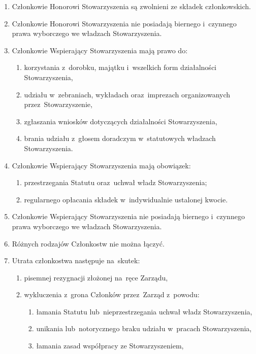 \documentclass{article}
\begin{document}
\begin{enumerate}
\begin{enumerate}
      \end{enumerate}
    \item Członkowie Honorowi Stowarzyszenia są zwolnieni ze składek członkowskich.
    \item Członkowie Honorowi Stowarzyszenia nie posiadają biernego i~czynnego prawa wyborczego we władzach Stowarzyszenia.
    \item[13a.] Członkowie Wspierający Stowarzyszenia mają prawo do:
      \begin{enumerate}[label=13a.\arabic*.]
        \item korzystania z~dorobku, majątku i~wszelkich form działalności Stowarzyszenia,
        \item udziału w~zebraniach, wykładach oraz~imprezach organizowanych przez~Stowarzyszenie,
        \item zgłaszania wniosków dotyczących działalności Stowarzyszenia,
        \item brania udziału z~głosem doradczym w~statutowych władzach Stowarzyszenia.
      \end{enumerate}
    \item[13b.] Członkowie Wspierający Stowarzyszenia mają obowiązek:
      \begin{enumerate}[label=13b.\arabic*.]
        \item przestrzegania Statutu oraz~uchwał władz Stowarzyszenia;
        \item regularnego opłacania składek w~indywidualnie ustalonej kwocie.
      \end{enumerate}
    \item[13c.] Członkowie Wspierający Stowarzyszenia nie posiadają biernego i~czynnego prawa wyborczego we władzach Stowarzyszenia.
    \item Różnych rodzajów Członkostw nie można łączyć.
    \item Utrata członkostwa następuje na~skutek:
      \begin{enumerate}
        \item pisemnej rezygnacji złożonej na~ręce Zarządu,
        \item wykluczenia z~grona Członków przez~Zarząd z~powodu:
          \begin{enumerate}
            \item łamania Statutu lub~nieprzestrzegania uchwał władz Stowarzyszenia, \label{utrata-czlonkostwa-begin}
            \item unikania lub~notorycznego braku udziału w~pracach Stowarzyszenia,
            \item łamania zasad współpracy ze Stowarzyszeniem,

\end{enumerate}
\end{enumerate}
\end{enumerate}
\end{document}
